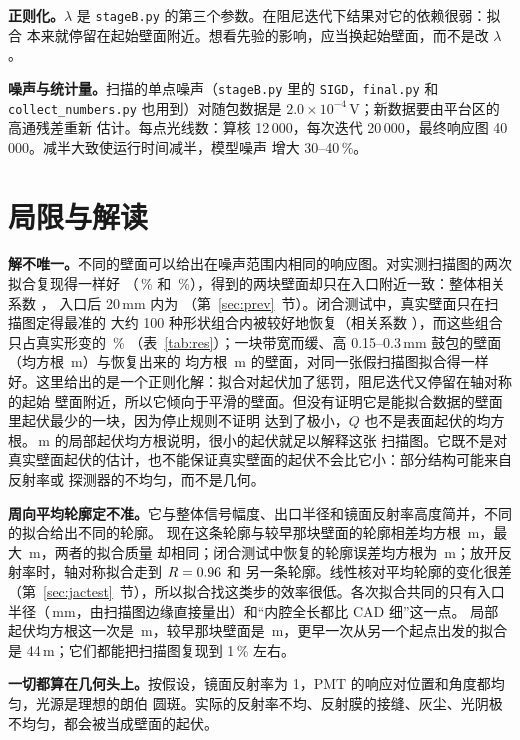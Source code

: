 \documentclass[11pt,a4paper,fontset=fandol]{ctexart}
\newcommand{\um}{\,\textmu m}
\newcommand{\code}[1]{\texttt{#1}}
\begin{document}
\textbf{正则化。}$\lambda$ 是 \code{stageB.py} 的第三个参数。在阻尼迭代下结果对它的依赖很弱：拟合
本来就停留在起始壁面附近。想看先验的影响，应当换起始壁面，而不是改 $\lambda$。

\textbf{噪声与统计量。}扫描的单点噪声（\code{stageB.py} 里的 \code{SIGD}，\code{final.py} 和
\code{collect\_numbers.py} 也用到）对随包数据是 $2.0\times10^{-4}$\,V；新数据要由平台区的高通残差重新
估计。每点光线数：算核 12\,000，每次迭代 20\,000，最终响应图 40\,000。减半大致使运行时间减半，模型噪声
增大 30--40\,\%。

\section{局限与解读}
\label{sec:limits}

\textbf{解不唯一。}不同的壁面可以给出在噪声范围内相同的响应图。对实测扫描图的两次拟合复现得一样好
（\PrevRmsEarlier\,\% 和 \PrevRmsNow\,\%），得到的两块壁面却只在入口附近一致：整体相关系数 \PrevCorr，
入口后 20\,mm 内为 \PrevCorrEntrance（第~\ref{sec:prev}~节）。闭合测试中，真实壁面只在扫描图定得最准的
大约 100 种形状组合内被较好地恢复（相关系数 \ResCHundred），而这些组合只占真实形变的 \ResFHundred\,\%
（表~\ref{tab:res}）；一块带宽而缓、高 0.15--0.3\,mm 鼓包的壁面（均方根 \ClRmsTrue\um）与恢复出来的
均方根 \ClRmsRec\um{} 的壁面，对同一张假扫描图拟合得一样好。这里给出的是一个正则化解：拟合对起伏加了惩罚，阻尼迭代又停留在轴对称的起始
壁面附近，所以它倾向于平滑的壁面。但没有证明它是能拟合数据的壁面里起伏最少的一块，因为停止规则不证明
达到了极小，$Q$ 也不是表面起伏的均方根。\LocRms\um{} 的局部起伏均方根说明，很小的起伏就足以解释这张
扫描图。它既不是对真实壁面起伏的估计，也不能保证真实壁面的起伏不会比它小：部分结构可能来自反射率或
探测器的不均匀，而不是几何。

\textbf{周向平均轮廓定不准。}它与整体信号幅度、出口半径和镜面反射率高度简并，不同的拟合给出不同的轮廓。
现在这条轮廓与较早那块壁面的轮廓相差均方根 \PrevProfDiff\um，最大 \PrevProfDiffMax\um，两者的拟合质量
却相同；闭合测试中恢复的轮廓误差均方根为 \ClProfErr\um；放开反射率时，轴对称拟合走到 $R=0.96$ 和
另一条轮廓。线性核对平均轮廓的变化很差（第~\ref{sec:jactest}~节），所以拟合找这类步的效率很低。各次拟合共同的只有入口半径（\RAp\,mm，由扫描图边缘直接量出）和“内腔全长都比 CAD 细”这一点。
局部起伏均方根这一次是 \LocRmsOne\um，较早那块壁面是 \PrevLocRms\um，更早一次从另一个起点出发的拟合是
44\um；它们都能把扫描图复现到 1\,\% 左右。

\textbf{一切都算在几何头上。}按假设，镜面反射率为 1，PMT 的响应对位置和角度都均匀，光源是理想的朗伯
圆斑。实际的反射率不均、反射膜的接缝、灰尘、光阴极不均匀，都会被当成壁面的起伏。
\end{document}
